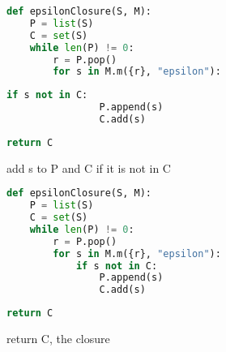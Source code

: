 \documentclass[8pt,a4paper,compress]{beamer}
\begin{document}
\begin{frame}[fragile]
\begin{overprint}
\begin{tcolorbox}[enhanced,drop shadow southwest,sharp corners,size=fbox,colback=white,fontlower=\small\ttfamily,collower=silver900]
\begin{lstlisting}[language=Python,style=focusout]
def epsilonClosure(S, M):
    P = list(S)
    C = set(S)
    while len(P) != 0:
        r = P.pop()
        for s in M.m({r}, "epsilon"):
\end{lstlisting}
\begin{lstlisting}[language=Python,style=focusin,backgroundcolor=\color{lime100}]
            if s not in C:
                P.append(s)
                C.add(s)
\end{lstlisting}
\begin{lstlisting}[language=Python,style=focusout]
    return C
\end{lstlisting}

\tcblower
\begin{minipage}[t][.25cm][t]{\textwidth}
add s to P and C if it is not in C
\end{minipage}
\end{tcolorbox}

\begin{tcolorbox}[enhanced,drop shadow southwest,sharp corners,size=fbox,colback=white,fontlower=\small\ttfamily,collower=silver900]

\begin{lstlisting}[language=Python,style=focusout]
def epsilonClosure(S, M):
    P = list(S)
    C = set(S)
    while len(P) != 0:
        r = P.pop()
        for s in M.m({r}, "epsilon"):
            if s not in C:
                P.append(s)
                C.add(s)
\end{lstlisting}
\begin{lstlisting}[language=Python,style=focusin,backgroundcolor=\color{lime100}]
    return C
\end{lstlisting}

\tcblower
\begin{minipage}[t][.25cm][t]{\textwidth}
return C, the closure
\end{minipage}
\end{tcolorbox}
\end{overprint}
\end{frame}
\end{document}

